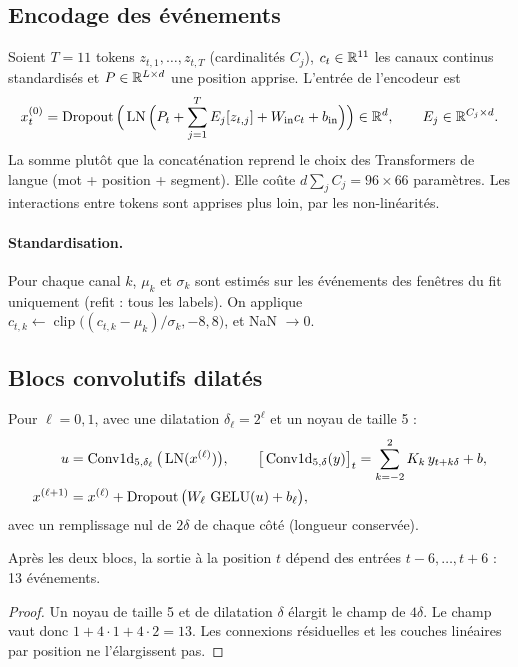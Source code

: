 \subsection{Encodage des événements}\label{sec:embed}
Soient $T=11$ tokens $z_{t,1},\dots,z_{t,T}$ (cardinalités $C_j$), $c_t\in\mathbb{R}^{11}$ les canaux continus standardisés et $P\in\mathbb{R}^{L\times d}$ une position apprise. L'entrée de l'encodeur est
\begin{equation}
x^{(0)}_t=\operatorname{Dropout}\Big(\operatorname{LN}\Big(P_t+\sum_{j=1}^{T}E_j[z_{t,j}]+W_{\text{in}}c_t+b_{\text{in}}\Big)\Big)\in\mathbb{R}^{d},\qquad E_j\in\mathbb{R}^{C_j\times d}.
\end{equation}
La somme plutôt que la concaténation reprend le choix des Transformers de langue (mot + position + segment). Elle coûte $d\sum_jC_j=96\times66$ paramètres. Les interactions entre tokens sont apprises plus loin, par les non-linéarités.

\paragraph{Standardisation.} Pour chaque canal $k$, $\mu_k$ et $\sigma_k$ sont estimés sur les événements des fenêtres du fit uniquement (refit : tous les labels). On applique $c_{t,k}\leftarrow\operatorname{clip}\big((c_{t,k}-\mu_k)/\sigma_k,-8,8\big)$, et NaN $\to0$.

\subsection{Blocs convolutifs dilatés}
Pour $\ell=0,1$, avec une dilatation $\delta_\ell=2^\ell$ et un noyau de taille 5 :
\begin{align}
u&=\operatorname{Conv1d}_{5,\delta_\ell}\big(\operatorname{LN}(x^{(\ell)})\big),\qquad
\big[\operatorname{Conv1d}_{5,\delta}(y)\big]_t=\sum_{k=-2}^{2}K_k\,y_{t+k\delta}+b,\\
x^{(\ell+1)}&=x^{(\ell)}+\operatorname{Dropout}\big(W_\ell\,\operatorname{GELU}(u)+b_\ell\big),
\end{align}
avec un remplissage nul de $2\delta$ de chaque côté (longueur conservée).

\begin{proposition}
Après les deux blocs, la sortie à la position $t$ dépend des entrées $t-6,\dots,t+6$ : 13 événements.
\end{proposition}
\begin{proof}
Un noyau de taille 5 et de dilatation $\delta$ élargit le champ de $4\delta$. Le champ vaut donc $1+4\cdot1+4\cdot2=13$. Les connexions résiduelles et les couches linéaires par position ne l'élargissent pas.
\end{proof}

